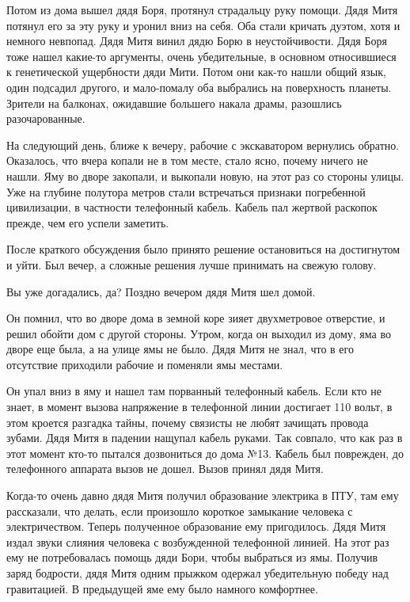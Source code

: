 Потом из дома вышел дядя Боря, протянул страдальцу руку помощи. Дядя Митя
потянул его за эту руку и уронил вниз на себя. Оба стали кричать дуэтом, хотя и
немного невпопад. Дядя Митя винил дядю Борю в неустойчивости. Дядя Боря тоже
нашел какие-то аргументы, очень убедительные, в основном относившиеся к
генетической ущербности дяди Мити. Потом они как-то нашли общий язык, один
подсадил другого, и мало-помалу оба выбрались на поверхность планеты. Зрители
на балконах, ожидавшие большего накала драмы, разошлись разочарованные.

На следующий день, ближе к вечеру, рабочие с экскаватором вернулись обратно.
Оказалось, что вчера копали не в том месте, стало ясно, почему ничего не нашли.
Яму во дворе закопали, и выкопали новую, на этот раз со стороны улицы. Уже на
глубине полутора метров стали встречаться признаки погребенной цивилизации, в
частности телефонный кабель. Кабель пал жертвой раскопок прежде, чем его успели
заметить.

После краткого обсуждения было принято решение остановиться на достигнутом и
уйти. Был вечер, а сложные решения лучше принимать на свежую голову.

Вы уже догадались, да? Поздно вечером дядя Митя шел домой.

Он помнил, что во дворе дома в земной коре зияет двухметровое отверстие, и
решил обойти дом с другой стороны. Утром, когда он выходил из дому, яма во
дворе еще была, а на улице ямы не было. Дядя Митя не знал, что в его отсутствие
приходили рабочие и поменяли ямы местами.

Он упал вниз в яму и нашел там порванный телефонный кабель. Если кто не знает,
в момент вызова напряжение в телефонной линии достигает 110 вольт, в этом
кроется разгадка тайны, почему связисты не любят зачищать провода зубами. Дядя
Митя в падении нащупал кабель руками. Так совпало, что как раз в этот момент
кто-то пытался дозвониться до дома №13. Кабель был поврежден, до телефонного
аппарата вызов не дошел. Вызов принял дядя Митя.

Когда-то очень давно дядя Митя получил образование электрика в ПТУ, там ему
рассказали, что делать, если произошло короткое замыкание человека с
электричеством. Теперь полученное образование ему пригодилось. Дядя Митя издал
звуки слияния человека с возбужденной телефонной линией. На этот раз ему не
потребовалась помощь дяди Бори, чтобы выбраться из ямы. Получив заряд бодрости,
дядя Митя одним прыжком одержал убедительную победу над гравитацией. В
предыдущей яме ему было намного комфортнее.

